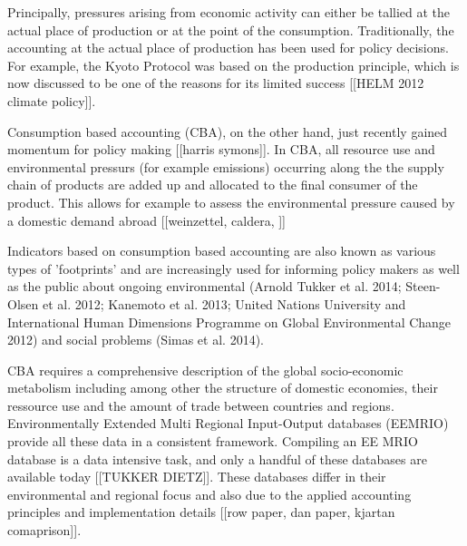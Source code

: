 Principally, pressures arising from economic activity can either be tallied at
the actual place of production or at the point of the consumption.
Traditionally, the accounting at the actual place of production has been used
for policy decisions. For example, the Kyoto Protocol was based on the
production principle, which is now discussed to be one of the reasons for its
limited success [[HELM 2012 climate policy]]. 

Consumption based accounting (CBA), on the other hand, just recently gained
momentum for policy making [[harris symons]]. In CBA, all resource use and environmental
pressurs (for example emissions) occurring along the the supply chain of
products are added up and allocated to the final consumer of the product. This
allows for example to assess the environmental pressure caused by a domestic
demand abroad [[weinzettel, caldera, ]]

Indicators based on consumption based accounting are also known as various
types of 'footprints' and are increasingly used for informing policy makers as
well as the public about ongoing environmental (Arnold Tukker et al. 2014;
Steen-Olsen et al. 2012; Kanemoto et al. 2013; United Nations University and
International Human Dimensions Programme on Global Environmental Change 2012)
and social problems (Simas et al. 2014). 

CBA requires a comprehensive description of the global socio-economic
metabolism including among other the structure of domestic economies, their
ressource use and the amount of trade between countries and regions.
Environmentally Extended Multi Regional Input-Output databases (EEMRIO) provide
all these data in a consistent framework. Compiling an EE MRIO database is a
data intensive task, and only a handful of these databases are available today
[[TUKKER DIETZ]]. These databases differ in their environmental and regional
focus and also due to the applied accounting principles and implementation
details [[row paper, dan paper, kjartan comaprison]]. 